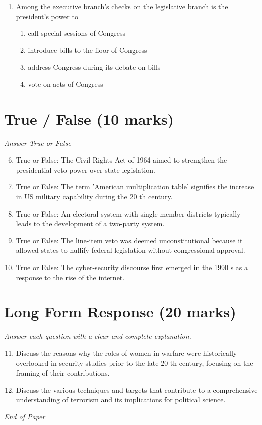 \documentclass[12pt]{article}
\begin{document}
\begin{enumerate}[label=\arabic*.]
\begin{enumerate}[label=(\alph*)]
    \item A corrupted program
\end{enumerate}
\item Among the executive branch's checks on the legislative branch is the president's power to
\begin{enumerate}[label=(\alph*)]
    \item call special sessions of Congress
    \item introduce bills to the floor of Congress
    \item address Congress during its debate on bills
    \item vote on acts of Congress
\end{enumerate}
\end{enumerate}

\section*{True / False (10 marks)}
\textit{Answer True or False}
\begin{enumerate}[label=\arabic*.]
\setcounter{enumi}{5}
\item True or False: The Civil Rights Act of 1964 aimed to strengthen the presidential veto power over state legislation.
\item True or False: The term 'American multiplication table' signifies the increase in US military capability during the 20 th century.
\item True or False: An electoral system with single-member districts typically leads to the development of a two-party system.
\item True or False: The line-item veto was deemed unconstitutional because it allowed states to nullify federal legislation without congressional approval.
\item True or False: The cyber-security discourse first emerged in the 1990 s as a response to the rise of the internet.
\end{enumerate}

\section*{Long Form Response (20 marks)}
\textit{Answer each question with a clear and complete explanation.}
\begin{enumerate}[label=\arabic*.]
\setcounter{enumi}{10}
\item Discuss the reasons why the roles of women in warfare were historically overlooked in security studies prior to the late 20 th century, focusing on the framing of their contributions.
\item Discuss the various techniques and targets that contribute to a comprehensive understanding of terrorism and its implications for political science.
\end{enumerate}

\vfill
\noindent\textit{End of Paper}
\end{document}
